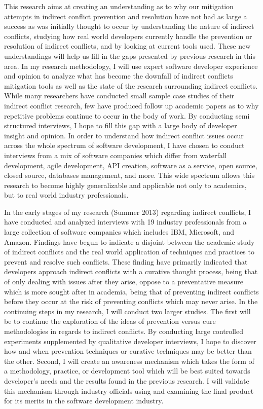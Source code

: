\documentclass[conference]{IEEEtran}
\begin{document}
This research aims at creating an understanding as to why our mitigation attempts in indirect conflict prevention and resolution have
not had as large a success as was initially thought to occur by understanding the nature of indirect conflicts, studying how real world
developers currently handle the prevention or resolution of indirect conflicts, and by looking at current tools used. These new understandings
will help us fill in the gaps presented by previous research in this area.
In my research methodology, I will use expert software developer experience
and opinion to analyze what has become the downfall of indirect conflicts mitigation tools as well as the state of the research surrounding
indirect conflicts. While many researchers have conducted small sample case studies of their indirect conflict research, few have
produced follow up academic papers as to why repetitive problems continue to occur in the body of work. By conducting semi structured interviews,
I hope to fill this gap with a large body of developer insight and opinion. In order to understand how indirect conflict issues occur across
the whole spectrum of software development, I have chosen to conduct interviews from a mix of software companies which differ from waterfall
development, agile development, API creation, software as a service, open source, closed source, databases management, and more. This wide
spectrum allows this research to become highly generalizable and applicable not only to academics, but to real world industry professionals.

In the early stages of my research (Summer 2013) regarding indirect conflicts, I have conducted and analyzed interviews with 19 industry
professionals from a large collection of software companies which includes IBM, Microsoft, and Amazon. Findings have begun to indicate a 
disjoint between the academic study of indirect conflicts and the real world application of techniques and practices to prevent and
resolve such conflicts. These finding have primarily indicated that developers approach indirect conflicts with a curative thought process,
being that of only dealing with issues after they arise, oppose to a preventative measure which is more sought after in academia, being that
of preventing indirect conflicts before they occur at the risk of preventing conflicts which may never arise. In the continuing steps in my
research, I will conduct two larger studies. The first will be to continue the exploration of the ideas of prevention versus cure methodologies
in regards to indirect conflicts. By conducting large controlled experiments supplemented by qualitative developer interviews, I hope to
discover how and when prevention techniques or curative techniques may be better than the other. Second, I will create an awareness mechanism
which takes the form of a methodology, practice, or development tool which will be best suited towards developer's needs and the results 
found in the previous research. I will validate this mechanism through industry officials using and examining the final product for its
merits in the software development industry. 
\end{document}
